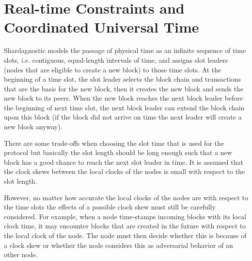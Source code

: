\section{Real-time Constraints and Coordinated Universal Time}
Shardagnostic models the passage of physical time as an infinite sequence of time
slots, i.e. contiguous, equal-length intervals of time, and assigns slot
leaders (nodes that are eligible to create a new block) to those time slots.
At the beginning of a time slot, the slot leader selects the block chain and
transactions that are the basis for the new block, then it creates the new
block and sends the new block to its peers.  When the new block reaches the
next block leader before the beginning of next time slot, the next block leader
can extend the block chain upon this block (if the block did not arrive on time
the next leader will create a new block anyway).

There are some trade-offs when choosing the slot time that is used for the
protocol but basically the slot length should be long enough such that a new
block has a good chance to reach the next slot leader in time.  It is assumed
that the clock skews between the local clocks of the nodes is small with
respect to the slot length.

However, no matter how accurate the local clocks of the nodes are with respect
to the time slots the effects of a possible clock skew must still be carefully
considered.  For example, when a node time-stamps incoming blocks with its
local clock time, it may encounter blocks that are created in the future with
respect to the local clock of the node.  The node must then decide whether this
is because of a clock skew or whether the node considers this as adversarial
behavior of an other node.

